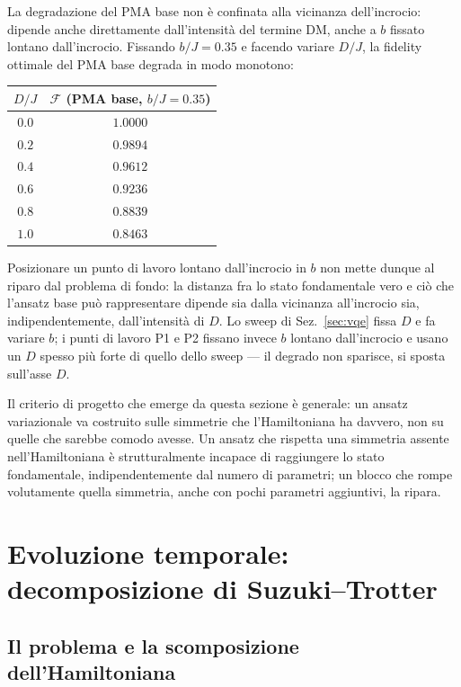 \documentclass[11pt,a4paper]{article}
\begin{document}
La degradazione del PMA base non è confinata alla vicinanza dell'incrocio:
dipende anche direttamente dall'intensità del termine DM, anche a $b$
fissato lontano dall'incrocio. Fissando $b/J=0.35$ e facendo variare
$D/J$, la fidelity ottimale del PMA base degrada in modo monotono:

\begin{center}
\renewcommand{\arraystretch}{1.15}
\begin{tabular}{@{}cc@{}}
\toprule
$D/J$ & $\mathcal F$ (PMA base, $b/J=0.35$) \\
\midrule
$0.0$ & $1.0000$ \\
$0.2$ & $0.9894$ \\
$0.4$ & $0.9612$ \\
$0.6$ & $0.9236$ \\
$0.8$ & $0.8839$ \\
$1.0$ & $0.8463$ \\
\bottomrule
\end{tabular}
\end{center}

Posizionare un punto di lavoro lontano dall'incrocio in $b$ non mette
dunque al riparo dal problema di fondo: la distanza fra lo stato
fondamentale vero e ciò che l'ansatz base può rappresentare dipende sia
dalla vicinanza all'incrocio sia, indipendentemente, dall'intensità di
$D$. Lo sweep di Sez.~\ref{sec:vqe} fissa $D$ e fa variare $b$; i punti
di lavoro P1 e P2 fissano invece $b$ lontano dall'incrocio e usano un $D$
spesso più forte di quello dello sweep --- il degrado non sparisce, si
sposta sull'asse $D$.

Il criterio di progetto che emerge da questa sezione è generale: un
ansatz variazionale va costruito sulle simmetrie che l'Hamiltoniana ha
davvero, non su quelle che sarebbe comodo avesse. Un ansatz che rispetta
una simmetria assente nell'Hamiltoniana è strutturalmente incapace di
raggiungere lo stato fondamentale, indipendentemente dal numero di
parametri; un blocco che rompe volutamente quella simmetria, anche con
pochi parametri aggiuntivi, la ripara.

\section{Evoluzione temporale: decomposizione di Suzuki--Trotter}
\label{sec:trotter}

\subsection{Il problema e la scomposizione dell'Hamiltoniana}
\end{document}
